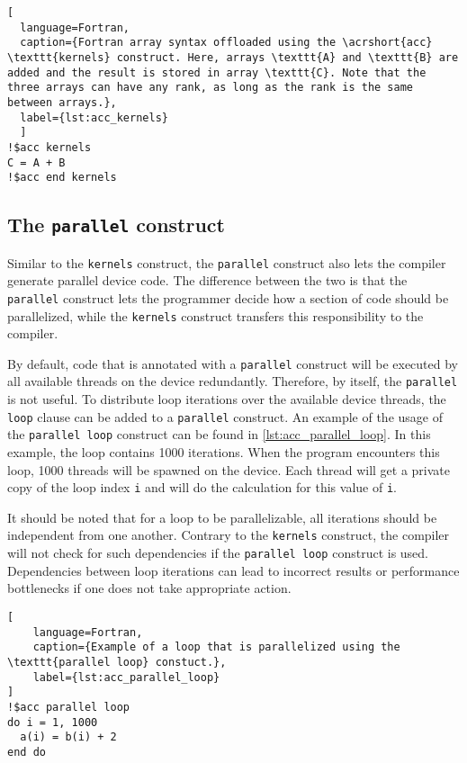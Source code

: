 \begin{lstlisting}[
  language=Fortran,
  caption={Fortran array syntax offloaded using the \acrshort{acc} \texttt{kernels} construct. Here, arrays \texttt{A} and \texttt{B} are added and the result is stored in array \texttt{C}. Note that the three arrays can have any rank, as long as the rank is the same between arrays.},
  label={lst:acc_kernels}
  ]
!$acc kernels
C = A + B
!$acc end kernels
\end{lstlisting}

\subsection{The \texttt{parallel} construct}
Similar to the \texttt{kernels} construct, the \texttt{parallel} construct also lets the compiler generate parallel device code. The difference between the two is that the \texttt{parallel} construct lets the programmer decide how a section of code should be parallelized, while the \texttt{kernels} construct transfers this responsibility to the compiler. 

By default, code that is annotated with a \texttt{parallel} construct will be executed by all available threads on the device redundantly. Therefore, by itself, the \texttt{parallel} is not useful. To distribute loop iterations over the available device threads, the \texttt{loop} clause can be added to a \texttt{parallel} construct. An example of the usage of the \texttt{parallel loop} construct can be found in \autoref{lst:acc_parallel_loop}. In this example, the loop contains 1000 iterations. When the program encounters this loop, 1000 threads will be spawned on the device. Each thread will get a private copy of the loop index \texttt{i} and will do the calculation for this value of \texttt{i}. 

It should be noted that for a loop to be parallelizable, all iterations should be independent from one another. Contrary to the \texttt{kernels} construct, the compiler will not check for such dependencies if the \texttt{parallel loop} construct is used. Dependencies between loop iterations can lead to incorrect results or performance bottlenecks if one does not take appropriate action. 

\begin{lstlisting}[
    language=Fortran,
    caption={Example of a loop that is parallelized using the \texttt{parallel loop} constuct.},
    label={lst:acc_parallel_loop}
]
!$acc parallel loop
do i = 1, 1000
  a(i) = b(i) + 2
end do
\end{lstlisting}

